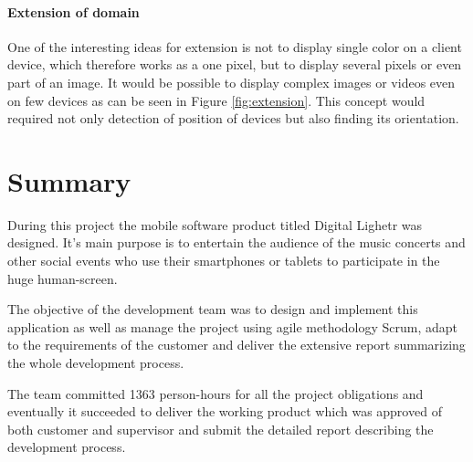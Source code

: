 \paragraph{Extension of domain}
One of the interesting ideas for extension is not to display single color on a client device, which therefore works as a one pixel, but to display several pixels or even part of an image.
It would be possible to display complex images or videos even on few devices as can be seen in Figure \ref{fig:extension}.
This concept would required not only detection of position of devices but also finding its orientation.

\section{Summary}
During this project the mobile software product titled Digital Lighetr was designed. It's main purpose is to entertain the audience of the music concerts and other social events who use their smartphones or tablets to participate in the huge human-screen.

The objective of the development team was to design and implement this application as well as manage the project using agile methodology Scrum, adapt to the requirements of the customer and deliver the extensive report summarizing the whole development process.

The team committed 1363 person-hours for all the project obligations and eventually it succeeded to deliver the working product which was approved of both customer and supervisor and submit the detailed report describing the development process.

